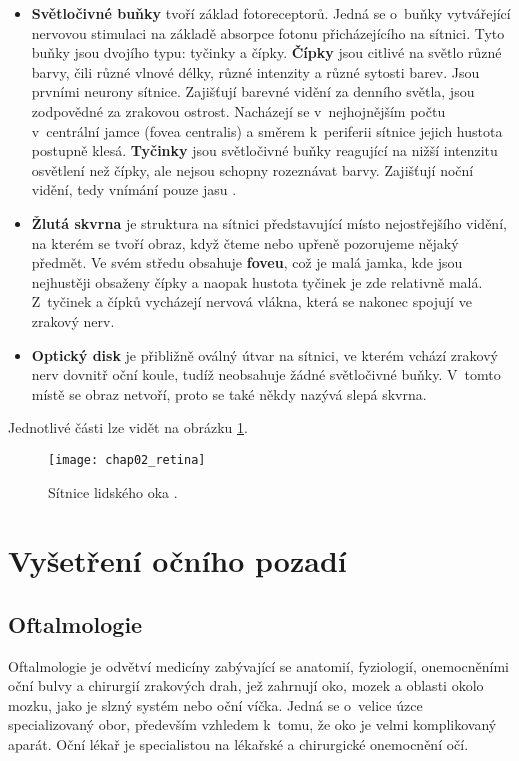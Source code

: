 \begin{itemize}
  \item\textbf{Světločivné buňky} tvoří základ fotoreceptorů. Jedná se o~buňky vytvářející nervovou stimulaci na základě absorpce fotonu přicházejícího na sítnici. Tyto buňky jsou dvojího typu: tyčinky a čípky. \textbf{Čípky} jsou citlivé na světlo různé barvy, čili různé vlnové délky, různé intenzity a různé sytosti barev. Jsou prvními neurony sítnice. Zajišťují barevné vidění za denního světla, jsou zodpovědné za zrakovou ostrost. Nacházejí se v~nejhojnějším počtu v~centrální jamce (fovea centralis) a směrem k~periferii sítnice jejich hustota postupně klesá. \textbf{Tyčinky} jsou světločivné buňky reagující na nižší intenzitu osvětlení než čípky, ale nejsou schopny rozeznávat barvy. Zajišťují noční vidění, tedy vnímání pouze jasu \cite{anatomie_oka}.
  \item\textbf{Žlutá skvrna} je struktura na sítnici představující místo nejostřejšího vidění, na kterém se tvoří obraz, když čteme nebo upřeně pozorujeme nějaký předmět. Ve svém středu obsahuje \textbf{foveu}, což je malá jamka, kde jsou nejhustěji obsaženy čípky a naopak hustota tyčinek je zde relativně malá. Z~tyčinek a čípků vycházejí nervová vlákna, která se nakonec spojují ve zrakový nerv.
  \item\textbf{Optický disk} je přibližně oválný útvar na sítnici, ve kterém vchází zrakový nerv dovnitř oční koule, tudíž neobsahuje žádné světločivné buňky. V~tomto místě se obraz netvoří, proto se také někdy nazývá slepá skvrna.
\end{itemize}

Jednotlivé části lze vidět na obrázku \ref{pic:chap02_retina}.
  
\vspace{10mm}

\begin{figure}[h]
  \begin{center}
    \texttt{[image: chap02\_retina]}
    \caption{Sítnice lidského oka \cite{pic_retina}.}
    \label{pic:chap02_retina}
  \end{center}
\end{figure}


\section{Vyšetření očního pozadí}
\label{sec:vysetreni}

\subsection*{Oftalmologie}
Oftalmologie je odvětví medicíny zabývající se anatomií, fyziologií, onemocněními oční bulvy a chirurgií zrakových drah, jež zahrnují oko, mozek a oblasti okolo mozku, jako je slzný systém nebo oční víčka. Jedná se o~velice úzce specializovaný obor, především vzhledem k~tomu, že oko je velmi komplikovaný aparát. Oční lékař je specialistou na lékařské a chirurgické onemocnění očí.


